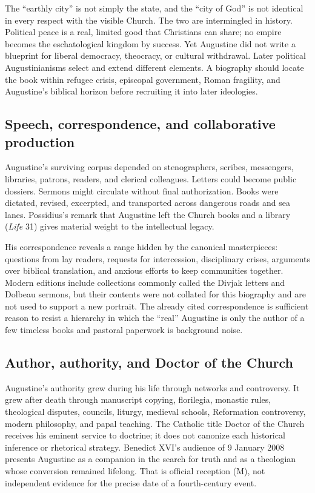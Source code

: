 The “earthly city” is not simply the state, and the “city of God” is not
identical in every respect with the visible Church. The two are intermingled
in history. Political peace is a real, limited good that Christians can share;
no empire becomes the eschatological kingdom by success. Yet Augustine did not
write a blueprint for liberal democracy, theocracy, or cultural withdrawal.
Later political Augustinianisms select and extend different elements. A
biography should locate the book within refugee crisis, episcopal government,
Roman fragility, and Augustine's biblical horizon before recruiting it into
later ideologies.

\subsection{Speech, correspondence, and collaborative production}

Augustine's surviving corpus depended on stenographers, scribes, messengers,
libraries, patrons, readers, and clerical colleagues. Letters could become
public dossiers. Sermons might circulate without final authorization. Books
were dictated, revised, excerpted, and transported across dangerous roads and
sea lanes. Possidius's remark that Augustine left the Church books and a
library (\emph{Life} 31) gives material weight to the intellectual legacy.

His correspondence reveals a range hidden by the canonical masterpieces:
questions from lay readers, requests for intercession, disciplinary crises,
arguments over biblical translation, and anxious efforts to keep communities
together. Modern editions include collections commonly called the Divjak
letters and Dolbeau sermons, but their contents were not collated for this
biography and are not used to support a new portrait. The already cited
correspondence is sufficient reason to resist a hierarchy in which the “real”
Augustine is only the author of a few timeless books and pastoral paperwork is
background noise.

\subsection{Author, authority, and Doctor of the Church}

Augustine's authority grew during his life through networks and controversy.
It grew after death through manuscript copying, florilegia, monastic rules,
theological disputes, councils, liturgy, medieval schools, Reformation
controversy, modern philosophy, and papal teaching. The Catholic title Doctor
of the Church receives his eminent service to doctrine; it does not canonize
each historical inference or rhetorical strategy. Benedict XVI's audience of
9 January 2008 presents Augustine as a companion in the search for truth and
as a theologian whose conversion remained lifelong. That is official reception
(M), not independent evidence for the precise date of a fourth-century event.

